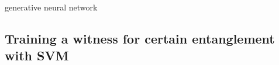 \documentclass[
aps,
pra,
floatfix,
]{revtex4-2}
\theoremstyle{plain}
\theoremstyle{definition}
\begin{document}
generative neural network \cite{zhuFlexibleLearningQuantum2022}
	




\subsection{Training a witness for certain entanglement with SVM}
\end{document}
